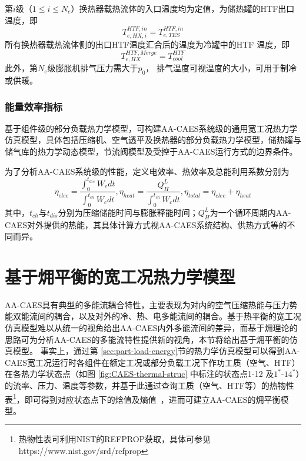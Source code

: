 第$i$级（$1\le i\le N_e$）换热器载热流体的入口温度均为定值，为储热罐的HTF出口温度，即
\begin{equation}
T_{e,HX,i}^{HTF,in} = {T_{e,TES}^{HTF,in}}
\end{equation}
所有换热器载热流体侧的出口HTF温度汇合后的温度为冷罐中的HTF 温度，即
\begin{equation}
T_{e,HX}^{HTF,Merge} = T_{cool}^{HTF}
\end{equation}
此外，第$N_e$级膨胀机排气压力需大于$p_0$， 排气温度可视温度的大小，可用于制冷或供暖。

\subsubsection{能量效率指标}
\label{sec:part-load-energy-full}
基于组件级的部分负载热力学模型，可构建AA-CAES系统级的通用宽工况热力学仿真模型，具体包括压缩机、空气透平及换热器的部分负载热力学模型，储热罐与储气库的热力学动态模型，节流阀模型及受控于AA-CAES运行方式的边界条件。

为了分析AA-CAES系统级的性能，定义电效率、热效率及总能利用系数分别为
\begin{equation}
{\eta _{elec}} = \frac{{\int_0^{{t_{dis}}} {{W_e}dt}}}{{{\int_0^{{t_{ch}}} {{W_c}dt}}}}, {\eta _{heat}} = \frac{{Q_H^L}}{{{\int_0^{{t_{ch}}} {{W_c}dt}}}}, {\eta _{total}} = {\eta _{elec}} + {\eta _{heat}}
\end{equation}
其中，$t_{ch}$与$t_{dis}$分别为压缩储能时间与膨胀释能时间；$Q_{H}^{L}$为一个循环周期内AA-CAES对外提供的热能，其具体计算方式视AA-CAES系统结构、供热方式等的不同而异。%

\section{基于㶲平衡的宽工况热力学模型}
\label{sec:chap2-part-load-exergy}
AA-CAES具有典型的多能流耦合特性，主要表现为对内的空气压缩热能与压力势能双能流间的耦合，以及对外的冷、热、电多能流间的耦合。基于热平衡的宽工况仿真模型难以从统一的视角给出AA-CAES内外多能流间的差异，而基于㶲理论的思路可为分析AA-CAES的多能流特性提供新的视角，本节将给出基于㶲平衡的仿真模型。 事实上，通过第
\ref{sec:part-load-energy}节的热力学仿真模型可以得到AA-CAES宽工况运行时各组件在额定工况或部分负载工况下作功工质（空气、HTF）在各热力学状态点（如图
\ref{fig:CAES-thermal-struc} 中标注的状态点1-12 及$1^*$-$14^*$）的流率、压力、温度等参数，并基于此通过查询工质（空气、HTF等）的热物性表\footnote{热物性表可利用NIST的REFPROP获取，具体可参见https://www.nist.gov/srd/refprop}，即可得到对应状态点下的焓值及熵值~\cite{Eng-Thermo-83}，进而可建立AA-CAES的㶲平衡模型。

